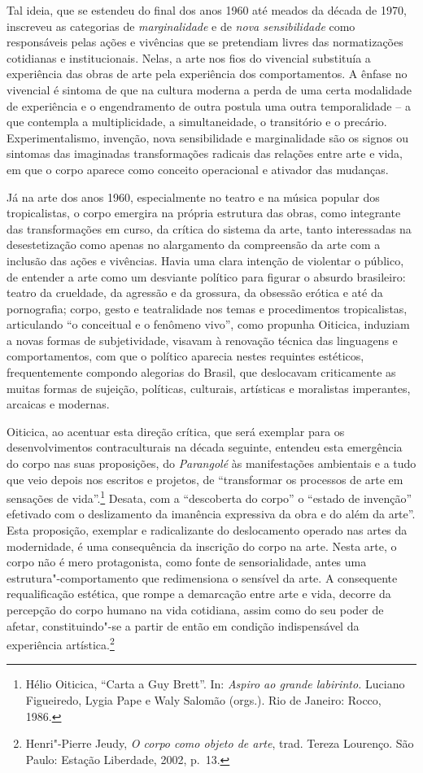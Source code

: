 Tal ideia, que se estendeu do final dos anos 1960 até meados da década
de 1970, inscreveu as categorias de \emph{marginalidade} e de \emph{nova
sensibilidade} como responsáveis pelas ações e vivências que se
pretendiam livres das normatizações cotidianas e institucionais. Nelas,
a arte nos fios do vivencial substituía a experiência das obras de arte
pela experiência dos comportamentos. A ênfase no vivencial é sintoma de
que na cultura moderna a perda de uma certa modalidade de experiência e
o engendramento de outra postula uma outra temporalidade -- a que
contempla a multiplicidade, a simultaneidade, o transitório e o
precário. Experimentalismo, invenção, nova sensibilidade e marginalidade
são os signos ou sintomas das imaginadas transformações radicais das
relações entre arte e vida, em que o corpo aparece como conceito
operacional e ativador das mudanças.

Já na arte dos anos 1960, especialmente no teatro e na música popular
dos tropicalistas, o corpo emergira na própria estrutura das obras, como
integrante das transformações em curso, da crítica do sistema da arte,
tanto interessadas na desestetização como apenas no alargamento da
compreensão da arte com a inclusão das ações e vivências. Havia uma clara
intenção de violentar o público, de entender a arte como um desviante
político para figurar o absurdo brasileiro: teatro da crueldade, da
agressão e da grossura, da obsessão erótica e até da pornografia; corpo,
gesto e teatralidade nos temas e procedimentos tropicalistas,
articulando ``o conceitual e o fenômeno vivo'', como propunha Oiticica,
induziam a novas formas de subjetividade, visavam à renovação técnica
das linguagens e comportamentos, com que o político aparecia nestes
requintes estéticos, frequentemente compondo alegorias do Brasil, que
deslocavam criticamente as muitas formas de sujeição, políticas,
culturais, artísticas e moralistas imperantes, arcaicas e modernas.

Oiticica, ao acentuar esta direção crítica, que será exemplar para os
desenvolvimentos contraculturais na década seguinte, entendeu esta
emergência do corpo nas suas proposições, do \emph{Parangolé} às
manifestações ambientais e a tudo que veio depois nos escritos e
projetos, de ``transformar os processos de arte em sensações de
vida''.\footnote{Hélio Oiticica, ``Carta a Guy Brett''. In: \emph{Aspiro
  ao grande labirinto.} Luciano Figueiredo, Lygia Pape e Waly Salomão
  (orgs.). Rio de Janeiro: Rocco, 1986.} Desata, com a ``descoberta do
corpo'' o ``estado de invenção'' efetivado com o deslizamento da
imanência expressiva da obra e do além da arte''. Esta proposição,
exemplar e radicalizante do deslocamento operado nas artes da
modernidade, é uma consequência da inscrição do corpo na arte. Nesta
arte, o corpo não é mero protagonista, como fonte de sensorialidade,
antes uma estrutura"-comportamento que redimensiona o sensível da arte. A
consequente requalificação estética, que rompe a demarcação entre arte e
vida, decorre da percepção do corpo humano na vida cotidiana, assim como
do seu poder de afetar, constituindo"-se a partir de então em condição
indispensável da experiência artística.\footnote{Henri"-Pierre Jeudy,
  \emph{O corpo como objeto de arte}, trad. Tereza Lourenço. São Paulo:
  Estação Liberdade, 2002, p.~13.}

